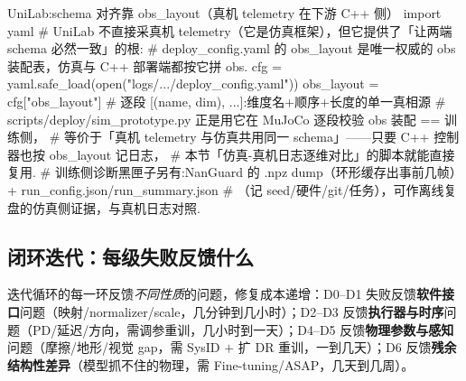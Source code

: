 \begin{codebox}[Python]{UniLab:schema 对齐靠 obs\_layout（真机 telemetry 在下游 C++ 侧）}
import yaml
# UniLab 不直接采真机 telemetry（它是仿真框架），但它提供了「让两端 schema 必然一致」的根:
# deploy_config.yaml 的 obs_layout 是唯一权威的 obs 装配表，仿真与 C++ 部署端都按它拼 obs.
cfg = yaml.safe_load(open("logs/.../deploy_config.yaml"))
obs_layout = cfg["obs_layout"]   # 逐段 [(name, dim), ...]:维度名+顺序+长度的单一真相源
# scripts/deploy/sim_prototype.py 正是用它在 MuJoCo 逐段校验 obs 装配 == 训练侧，
#   等价于「真机 telemetry 与仿真共用同一 schema」——只要 C++ 控制器也按 obs_layout 记日志，
#   本节「仿真-真机日志逐维对比」的脚本就能直接复用.
# 训练侧诊断黑匣子另有:NanGuard 的 .npz dump（环形缓存出事前几帧）+ run_config.json/run_summary.json
#   （记 seed/硬件/git/任务），可作离线复盘的仿真侧证据，与真机日志对照.
\end{codebox}

\subsection{闭环迭代：每级失败反馈什么}
\label{sec:rlmc-s2r-loop}

迭代循环的每一环反馈\emph{不同性质}的问题，修复成本递增：D0--D1 失败反馈\textbf{软件接口}问题（映射/normalizer/scale，几分钟到几小时）；D2--D3 反馈\textbf{执行器与时序}问题（PD/延迟/方向，需调参重训，几小时到一天）；D4--D5 反馈\textbf{物理参数与感知}问题（摩擦/地形/视觉 gap，需 SysID $+$ 扩 DR 重训，一到几天）；D6 反馈\textbf{残余结构性差异}（模型抓不住的物理，需 Fine-tuning/ASAP，几天到几周）。



